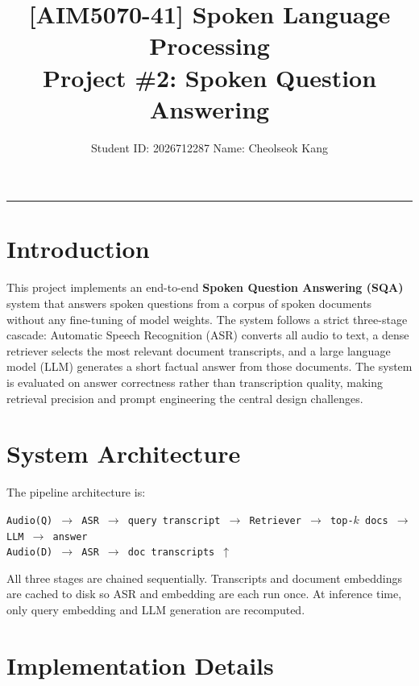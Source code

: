 \documentclass[11pt,a4paper]{article}
\title{\textbf{[AIM5070-41] Spoken Language Processing\\Project \#2: Spoken Question Answering}}
\author{Student ID: 2026712287 \quad Name: Cheolseok Kang}
\date{}
\begin{document}
\maketitle
\vspace{-1em}
\hrule
\vspace{0.5em}

\section{Introduction}

This project implements an end-to-end \textbf{Spoken Question Answering (SQA)} system that answers spoken questions from a corpus of spoken documents without any fine-tuning of model weights. The system follows a strict three-stage cascade: Automatic Speech Recognition (ASR) converts all audio to text, a dense retriever selects the most relevant document transcripts, and a large language model (LLM) generates a short factual answer from those documents. The system is evaluated on answer correctness rather than transcription quality, making retrieval precision and prompt engineering the central design challenges.

\section{System Architecture}

The pipeline architecture is:

\vspace{4pt}
\noindent\texttt{Audio(Q) $\rightarrow$ ASR $\rightarrow$ query transcript $\rightarrow$ Retriever $\rightarrow$ top-$k$ docs $\rightarrow$ LLM $\rightarrow$ answer}\\
\texttt{Audio(D) $\rightarrow$ ASR $\rightarrow$ doc transcripts \hspace{4.2cm} $\uparrow$}
\vspace{4pt}

All three stages are chained sequentially. Transcripts and document embeddings are cached to disk so ASR and embedding are each run once. At inference time, only query embedding and LLM generation are recomputed.

\section{Implementation Details}
\end{document}
